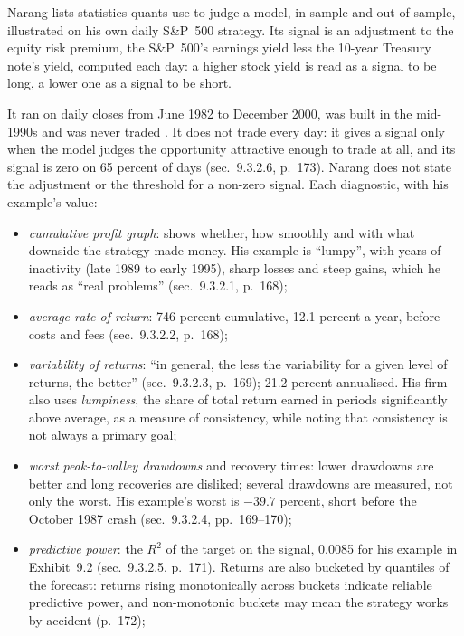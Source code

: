 \begin{qfmethod}\label{meth:backtest-evaluation-diagnostics}
 Narang lists statistics quants use to judge a model, in sample and out of sample, illustrated on his own daily S\&P~500 strategy. Its signal is an adjustment to the equity risk premium, the S\&P~500's earnings yield less the 10-year Treasury note's yield, computed each day: a higher stock yield is read as a signal to be long, a lower one as a signal to be short.

It ran on daily closes from June 1982 to December 2000, was built in the mid-1990s and was never traded \citep[chap.~``Research'', sec.~9.3.2, p.~168]{s7-narang}. It does not trade every day: it gives a signal only when the model judges the opportunity attractive enough to trade at all, and its signal is zero on 65 percent of days (sec.~9.3.2.6, p.~173). Narang does not state the adjustment or the threshold for a non-zero signal. Each diagnostic, with his example's value:
\begin{itemize}
\item \emph{cumulative profit graph}: shows whether, how smoothly and with what downside the strategy made money. His example is ``lumpy'', with years of inactivity (late 1989 to early 1995), sharp losses and steep gains, which he reads as ``real problems'' (sec.~9.3.2.1, p.~168);
\item \emph{average rate of return}: 746 percent cumulative, 12.1 percent a year, before costs and fees (sec.~9.3.2.2, p.~168);
\item \emph{variability of returns}: ``in general, the less the variability for a given level of returns, the better'' (sec.~9.3.2.3, p.~169); 21.2 percent annualised. His firm also uses \emph{lumpiness}, the share of total return earned in periods significantly above average, as a measure of consistency, while noting that consistency is not always a primary goal;
\item \emph{worst peak-to-valley drawdowns} and recovery times: lower drawdowns are better and long recoveries are disliked; several drawdowns are measured, not only the worst. His example's worst is $-39.7$ percent, short before the October 1987 crash (sec.~9.3.2.4, pp.~169--170);
\item \emph{predictive power}: the $R^2$ of the target on the signal, 0.0085 for his example in Exhibit~9.2 (sec.~9.3.2.5, p.~171). Returns are also bucketed by quantiles of the forecast: returns rising monotonically across buckets indicate reliable predictive power, and non-monotonic buckets may mean the strategy works by accident (p.~172);

\end{itemize}
\end{qfmethod}
